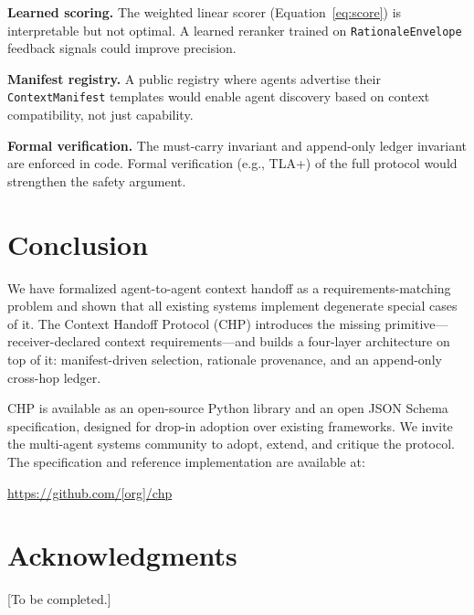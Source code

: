 \documentclass[11pt]{article}
\begin{document}
\textbf{Learned scoring.} The weighted linear scorer
(Equation~\ref{eq:score}) is interpretable but not optimal. A learned
reranker trained on \texttt{RationaleEnvelope} feedback signals could
improve precision.

\textbf{Manifest registry.} A public registry where agents advertise their
\texttt{ContextManifest} templates would enable agent discovery based on
context compatibility, not just capability.

\textbf{Formal verification.} The must-carry invariant and append-only ledger
invariant are enforced in code. Formal verification (e.g., TLA+) of the
full protocol would strengthen the safety argument.

\section{Conclusion}
\label{sec:conclusion}

We have formalized agent-to-agent context handoff as a
requirements-matching problem and shown that all existing systems implement
degenerate special cases of it. The Context Handoff Protocol (CHP) introduces
the missing primitive—receiver-declared context requirements—and builds a
four-layer architecture on top of it: manifest-driven selection, rationale
provenance, and an append-only cross-hop ledger.

CHP is available as an open-source Python library and an open JSON Schema
specification, designed for drop-in adoption over existing frameworks. We
invite the multi-agent systems community to adopt, extend, and critique the
protocol. The specification and reference implementation are available at:

\begin{center}
  \url{https://github.com/[org]/chp}
\end{center}

\section*{Acknowledgments}

[To be completed.]
\end{document}
